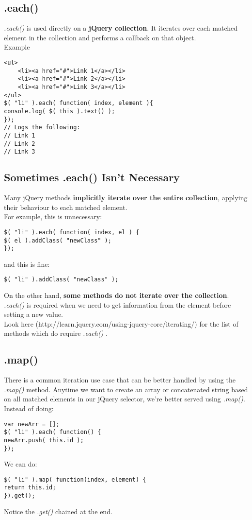 \documentclass[10pt,letterpaper]{report}
\begin{document}
\subsection{.each()}
\textit{.each()} is used directly on a \textbf{jQuery collection}. It iterates over each matched element in the collection and performs a callback on that object.\\
Example
\begin{lstlisting}
<ul>
	<li><a href="#">Link 1</a></li>
	<li><a href="#">Link 2</a></li>
	<li><a href="#">Link 3</a></li>
</ul>
$( "li" ).each( function( index, element ){
console.log( $( this ).text() );
});
// Logs the following:
// Link 1
// Link 2
// Link 3
\end{lstlisting}
\subsection{Sometimes .each() Isn't Necessary}
Many jQuery methods \textbf{implicitly iterate over the entire collection}, applying their behaviour to each matched element.\\
For example, this is unnecessary:
\begin{lstlisting}
$( "li" ).each( function( index, el ) {
$( el ).addClass( "newClass" );
});
\end{lstlisting}
and this is fine:
\begin{lstlisting}
$( "li" ).addClass( "newClass" );
\end{lstlisting}
On the other hand, \textbf{some methods do not iterate over the collection}. \textit{.each()} is required when we need to get information from the element before setting a new value.\\
Look here (http://learn.jquery.com/using-jquery-core/iterating/) for the list of methods which do require \textit{.each()} .
\subsection{.map()}
There is a common iteration use case that can be better handled by using the \textit{.map()} method. Anytime we want to create an array or concatenated string based on all matched elements in our jQuery selector, we're better served using \textit{.map()}.\\
Instead of doing:
\begin{lstlisting}
var newArr = [];
$( "li" ).each( function() {
newArr.push( this.id );
});
\end{lstlisting}
We can do:
\begin{lstlisting}
$( "li" ).map( function(index, element) {
return this.id;
}).get();
\end{lstlisting}
Notice the \textit{.get()} chained at the end.
\end{document}
